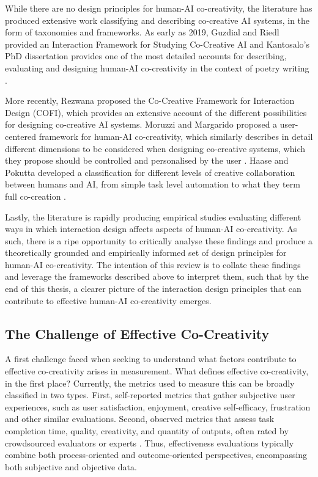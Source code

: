 While there are no design principles for human-AI co-creativity, the literature has produced extensive work classifying and describing co-creative AI systems, in the form of taxonomies and frameworks. As early as 2019, Guzdial and Riedl provided an Interaction Framework for Studying Co-Creative AI \cite{Guzdial2019-gr} and Kantosalo's PhD dissertation provides one of the most detailed accounts for describing, evaluating and designing human-AI co-creativity in the context of poetry writing \cite{Kantosalo2019-pz}. 

More recently, Rezwana \cite{Rezwana2022-gg} proposed the Co-Creative Framework for Interaction Design (COFI), which provides an extensive account of the different possibilities for designing co-creative AI systems. Moruzzi and Margarido proposed a user-centered framework for human-AI co-creativity, which similarly describes in detail different dimensions to be considered when designing co-creative systems, which they propose should be controlled and personalised by the user \cite{Moruzzi2024-cq}. Haase and Pokutta developed a classification for different levels of creative collaboration between humans and AI, from simple task level automation to what they term full co-creation \cite{Haase2024-yp}. 

Lastly, the literature is rapidly producing empirical studies evaluating different ways in which interaction design affects aspects of human-AI co-creativity. As such, there is a ripe opportunity to critically analyse these findings and produce a theoretically grounded and empirically informed set of design principles for human-AI co-creativity. The intention of this review is to collate these findings and leverage the frameworks described above to interpret them, such that by the end of this thesis, a clearer picture of the interaction design principles that can contribute to effective human-AI co-creativity emerges. 

\subsection{The Challenge of Effective Co-Creativity}

A first challenge faced when seeking to understand what factors contribute to effective co-creativity arises in measurement. What defines effective co-creativity, in the first place? Currently, the metrics used to measure this can be broadly classified in two types. First, self-reported metrics that gather subjective user experiences, such as user satisfaction, enjoyment, creative self-efficacy, frustration and other similar evaluations. Second, observed metrics that assess task completion time, quality, creativity, and quantity of outputs, often rated by crowdsourced evaluators or experts \cite{Kim2021-fh, Kantosalo2019-pz, Rezwana2022-ui, Rezwana2023-gj, Lawton2023-tb}. Thus, effectiveness evaluations typically combine both process-oriented and outcome-oriented perspectives, encompassing both subjective and objective data.

